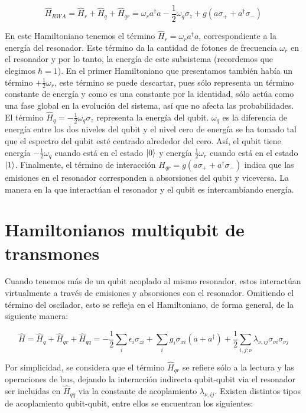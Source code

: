 \begin{equation}
    \hat{H}_{RWA} = \hat{H}_r + \hat{H}_q + \hat{H}_{qr} = \omega_r a^\dag a - \frac{1}{2} \omega_q \sigma_z + g(a \sigma_+ + a^\dag \sigma_-)
\end{equation}

En este Hamiltoniano tenemos el término $\hat{H}_r = \omega_r a^\dagger a$, correspondiente a la energía del resonador. Este término da la cantidad de fotones de frecuencia $\omega_r$ en el resonador y por lo tanto, la energía de este subsistema (recordemos que elegimos $\hbar = 1$). En el primer Hamiltoniano que presentamos también había un término $+ \frac{1}{2} \omega_r$, este término se puede descartar, pues sólo representa un término constante de energía y como es una constante por la identidad, sólo actúa como una fase global en la evolución del sistema, así que no afecta las probabilidades. El término $\hat{H}_q = - \frac{1}{2} \omega_q \sigma_z$ representa la energía del qubit. $\omega_q$ es la diferencia de energía entre los dos niveles del qubit y el nivel cero de energía se ha tomado tal que el espectro del qubit esté centrado alrededor del cero. Así, el qubit tiene energía $-\frac{1}{2} \omega_q$ cuando está en el estado $\ket{0}$ y energía $\frac{1}{2} \omega_r$ cuando está en el estado $\ket{1}$. Finalmente, el término de interacción $H_{qr} = g (a \sigma_+ + a^\dagger \sigma_-)$ indica que las emisiones en el resonador corresponden a absorsiones del qubit y viceversa. La manera en la que interactúan el resonador y el qubit es intercambiando energía.

\section{Hamiltonianos multiqubit de transmones}

Cuando tenemos más de un qubit acoplado al mismo resonador, estos interactúan virtualmente a través de emisiones y absorsiones con el resonador. Omitiendo el término del oscilador, esto se refleja en el Hamiltoniano, de forma general, de la siguiente manera:

\begin{equation}
\hat{H} = \hat{H}_q + \hat{H}_{qr} + \hat{H}_{qq} = -\frac{1}{2} \sum\limits_i \epsilon_i \sigma_{zi} + \sum\limits_i g_i \sigma_{xi} (a+a^\dag) + \frac{1}{2} \sum\limits_{i,j;\nu} \lambda_{\nu,ij} \sigma_{\nu i} \sigma_{\nu j}
\end{equation}

Por simplicidad, se considera que el término $\hat{H}_{qr}$ se refiere sólo a la lectura y las operaciones de bus, dejando la interacción indirecta qubit-qubit via el resonador ser incluidas en $\hat{H}_{qq}$ via la constante de acoplamiento $\lambda_{\nu,ij}$. Existen distintos tipos de acoplamiento qubit-qubit, entre ellos se encuentran los siguientes:

